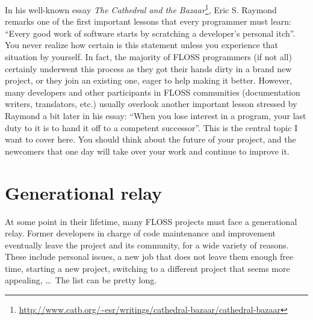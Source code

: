 

\noindent{}In his well-known essay \textit{The Cathedral and the
Bazaar}\footnote{\url{
http://www.catb.org/~esr/writings/cathedral-bazaar/cathedral-bazaar}}, Eric S.
Raymond remarks one of the first important lessons that every programmer must
learn: ``Every good work of software starts by scratching a developer's personal
itch''. You never realize how certain is this statement unless you experience
that situation by yourself. In fact, the majority of FLOSS programmers (if not
all) certainly underwent this process as they got their hands dirty in a brand
new project, or they join an existing one, eager to help making it better.
However, many developers and other participants in FLOSS communities
(documentation writers, translators, etc.) usually overlook another important
lesson stressed by Raymond a bit later in his essay: ``When you lose interest in
a program, your last duty to it is to hand it off to a competent successor''.
This is the central topic I want to cover here. You should think about the
future of your project, and the newcomers that one day will take over your work
and continue to improve it.

\section*{Generational relay}

At some point in their lifetime, many FLOSS projects must face a generational
relay. Former developers in charge of code maintenance and improvement
eventually leave the project and its community, for a wide variety of reasons.
These include personal issues, a new job that does not leave them enough free
time, starting a new project, switching to a different project that seems more
appealing, \dots\ The list can be pretty long.

